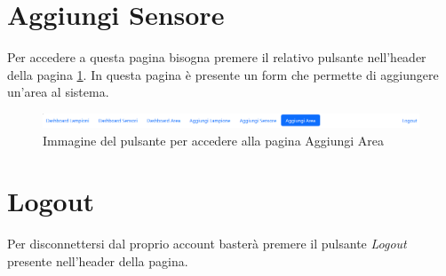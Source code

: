 \section{Aggiungi Sensore}

Per accedere a questa pagina bisogna premere il relativo pulsante nell'header della pagina \ref{fig:form_area}. In questa pagina è presente un form che permette di aggiungere un'area al sistema.

\begin{figure}[ht]
    \centering
    \includegraphics[width=\textwidth]{img/form_area.png}
    \caption{Immagine del pulsante per accedere alla pagina Aggiungi Area}
    \label{fig:form_area}
\end{figure}

\section{Logout}

Per disconnettersi dal proprio account basterà premere il pulsante \textit{Logout} presente nell'header della pagina.